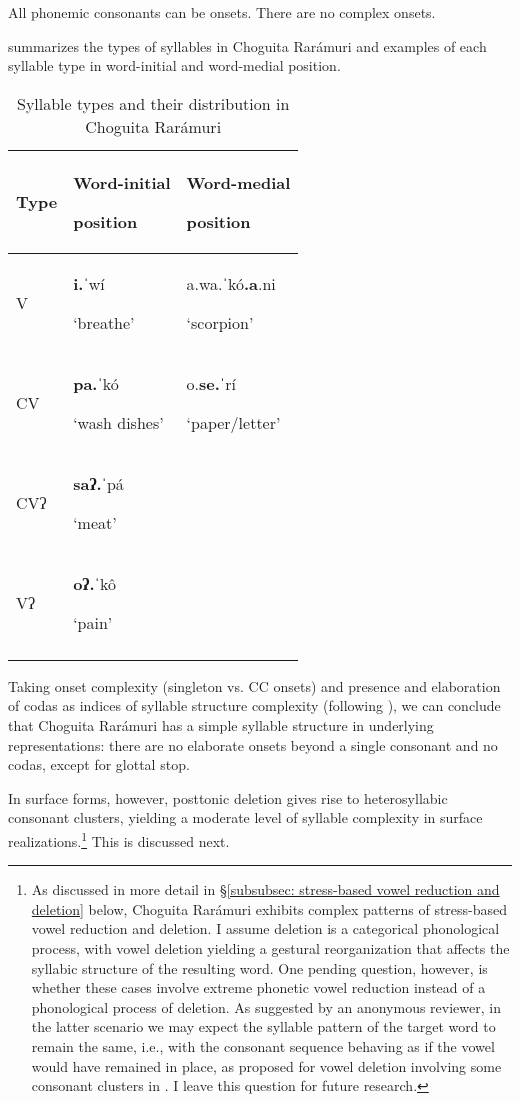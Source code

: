 All phonemic consonants can be onsets. There are no complex onsets.

 summarizes the types of syllables in Choguita Rarámuri and examples of each syllable type in word-initial and word-medial position.

\begin{table}
\caption{Syllable types and their distribution in Choguita Rarámuri}
\label{tab:key:6}

\begin{tabularx}{.75\textwidth}{lll}
 \lsptoprule
 \textbf{Type} & \textbf{Word-initial}

 \textbf{position} & \textbf{Word-medial}

 \textbf{position}\\
 \midrule
 V & \textbf{i.}ˈwí

 ‘breathe’ & a.wa.ˈkó\textbf{.a}.ni

 ‘scorpion’\\
 CV & \textbf{pa.}ˈkó

 ‘wash dishes’ & o.\textbf{se.}ˈrí

 ‘paper/letter’\\
 CVʔ & \textbf{saʔ.}ˈpá

 ‘meat’ & \\
 Vʔ & \textbf{oʔ.}ˈkô

 ‘pain’ & \\
\lspbottomrule
\end{tabularx}
\end{table}

Taking onset complexity (singleton vs. CC onsets) and presence and elaboration of codas as indices of syllable structure complexity (following \citealt{maddieson2005issues}), we can conclude that Choguita Rarámuri has a simple syllable structure in underlying representations: there are no elaborate onsets beyond a single consonant and no codas, except for glottal stop.

In surface forms, however, posttonic deletion gives rise to heterosyllabic consonant clusters, yielding a moderate level of syllable complexity in surface realizations.\footnote{As discussed in more detail in §\ref{subsubsec: stress-based vowel reduction and deletion} below, Choguita Rarámuri exhibits complex patterns of stress-based vowel reduction and deletion. I assume deletion is a categorical phonological process, with vowel deletion yielding a gestural reorganization that affects the syllabic structure of the resulting word. One pending question, however, is whether these cases involve extreme phonetic vowel reduction instead of a phonological process of deletion. As suggested by an anonymous reviewer, in the latter scenario we may expect the syllable pattern of the target word to remain the same, i.e., with the consonant sequence behaving as if the vowel would have remained in place, as proposed for vowel deletion involving some consonant clusters in  \citep{kawahara2022voweldeletion}. I leave this question for future research.} This is discussed next.


